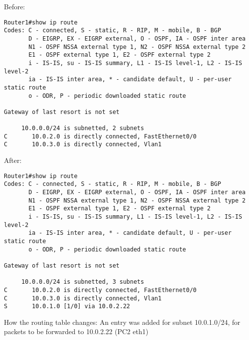 Before:
\begin{lstlisting}
Router1#show ip route
Codes: C - connected, S - static, R - RIP, M - mobile, B - BGP
       D - EIGRP, EX - EIGRP external, O - OSPF, IA - OSPF inter area 
       N1 - OSPF NSSA external type 1, N2 - OSPF NSSA external type 2
       E1 - OSPF external type 1, E2 - OSPF external type 2
       i - IS-IS, su - IS-IS summary, L1 - IS-IS level-1, L2 - IS-IS level-2
       ia - IS-IS inter area, * - candidate default, U - per-user static route
       o - ODR, P - periodic downloaded static route

Gateway of last resort is not set

     10.0.0.0/24 is subnetted, 2 subnets
C       10.0.2.0 is directly connected, FastEthernet0/0
C       10.0.3.0 is directly connected, Vlan1
\end{lstlisting}

After:
\begin{lstlisting}
Router1#show ip route
Codes: C - connected, S - static, R - RIP, M - mobile, B - BGP
       D - EIGRP, EX - EIGRP external, O - OSPF, IA - OSPF inter area 
       N1 - OSPF NSSA external type 1, N2 - OSPF NSSA external type 2
       E1 - OSPF external type 1, E2 - OSPF external type 2
       i - IS-IS, su - IS-IS summary, L1 - IS-IS level-1, L2 - IS-IS level-2
       ia - IS-IS inter area, * - candidate default, U - per-user static route
       o - ODR, P - periodic downloaded static route

Gateway of last resort is not set

     10.0.0.0/24 is subnetted, 3 subnets
C       10.0.2.0 is directly connected, FastEthernet0/0
C       10.0.3.0 is directly connected, Vlan1
S       10.0.1.0 [1/0] via 10.0.2.22
\end{lstlisting}

How the routing table changes: An entry was added for subnet 10.0.1.0/24, for packets to be forwarded to 10.0.2.22 (PC2 eth1)